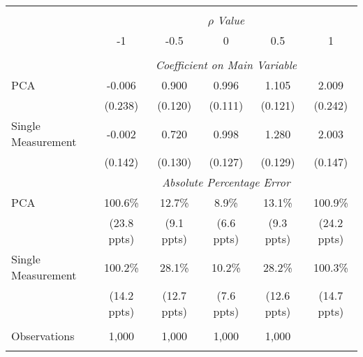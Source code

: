 \begin{table}[!htbp] \centering
\begin{tabular}{@{\extracolsep{5pt}}lccccc}
\\[-1.8ex]\hline
\hline \\[-1.8ex]
& \multicolumn{5}{c}{$\rho$ \textit{ Value}} \
\cr 
\\[-1.8ex] & -1 & -0.5 & 0 & 0.5 & 1 \\
\hline \\[-1.8ex]
& \multicolumn{5}{c}{\textit{Coefficient on Main Variable}} \\
 PCA & -0.006 & 0.900 & 0.996 & 1.105 & 2.009  \\
  & (0.238) & (0.120) & (0.111) & (0.121) & (0.242)\\
  Single Measurement & -0.002 & 0.720 & 0.998 & 1.280 & 2.003  \\
  & (0.142) & (0.130) & (0.127) & (0.129) & (0.147)\\
& \multicolumn{5}{c}{\textit{Absolute Percentage Error}} \\
  PCA & 100.6\% & 12.7\% & 8.9\% & 13.1\% & 100.9\% \\
   & (23.8 ppts) & (9.1 ppts) & (6.6 ppts) & (9.3 ppts) & (24.2 ppts)\\
  Single Measurement & 100.2\% & 28.1\% & 10.2\% & 28.2\% & 100.3\%  \\
  & (14.2 ppts) & (12.7 ppts) & (7.6 ppts) & (12.6 ppts) & (14.7 ppts)\\
\hline \\[-1.8ex]
 Observations & 1,000 & 1,000 & 1,000 & 1,000 &\\
\hline
\hline \\[-1.8ex]
\end{tabular}
\end{table}
